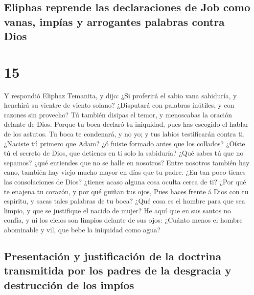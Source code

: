 \hypertarget{eliphas-reprende-las-declaraciones-de-job-como-vanas-impuxedas-y-arrogantes-palabras-contra-dios}{%
\subsection{Eliphas reprende las declaraciones de Job como vanas, impías
y arrogantes palabras contra
Dios}\label{eliphas-reprende-las-declaraciones-de-job-como-vanas-impuxedas-y-arrogantes-palabras-contra-dios}}

\hypertarget{section-14}{%
\section{15}\label{section-14}}

 Y respondió Eliphaz Temanita, y dijo:  ¿Si
proferirá el sabio vana sabiduría, y henchirá su vientre de viento
solano?  ¿Disputará con palabras inútiles, y con razones sin
provecho?  Tú también disipas el temor, y menoscabas la
oración delante de Dios.  Porque tu boca declaró tu
iniquidad, pues has escogido el hablar de los astutos.  Tu
boca te condenará, y no yo; y tus labios testificarán contra ti.
 ¿Naciste tú primero que Adam? ¿ó fuiste formado antes que
los collados?  ¿Oíste tú el secreto de Dios, que detienes en
ti solo la sabiduría?  ¿Qué sabes tú que no sepamos? ¿qué
entiendes que no se halle en nosotros?  Entre nosotros
también hay cano, también hay viejo mucho mayor en días que tu padre.
 ¿En tan poco tienes las consolaciones de Dios? ¿tienes
acaso alguna cosa oculta cerca de ti?  ¿Por qué te enajena
tu corazón, y por qué guiñan tus ojos,  Pues haces frente á
Dios con tu espíritu, y sacas tales palabras de tu boca? 
¿Qué cosa es el hombre para que sea limpio, y que se justifique el
nacido de mujer?  He aquí que en sus santos no confía, y ni
los cielos son limpios delante de sus ojos:  ¿Cuánto menos
el hombre abominable y vil, que bebe la iniquidad como agua?

\hypertarget{presentaciuxf3n-y-justificaciuxf3n-de-la-doctrina-transmitida-por-los-padres-de-la-desgracia-y-destrucciuxf3n-de-los-impuxedos}{%
\subsection{Presentación y justificación de la doctrina transmitida por
los padres de la desgracia y destrucción de los
impíos}\label{presentaciuxf3n-y-justificaciuxf3n-de-la-doctrina-transmitida-por-los-padres-de-la-desgracia-y-destrucciuxf3n-de-los-impuxedos}}

